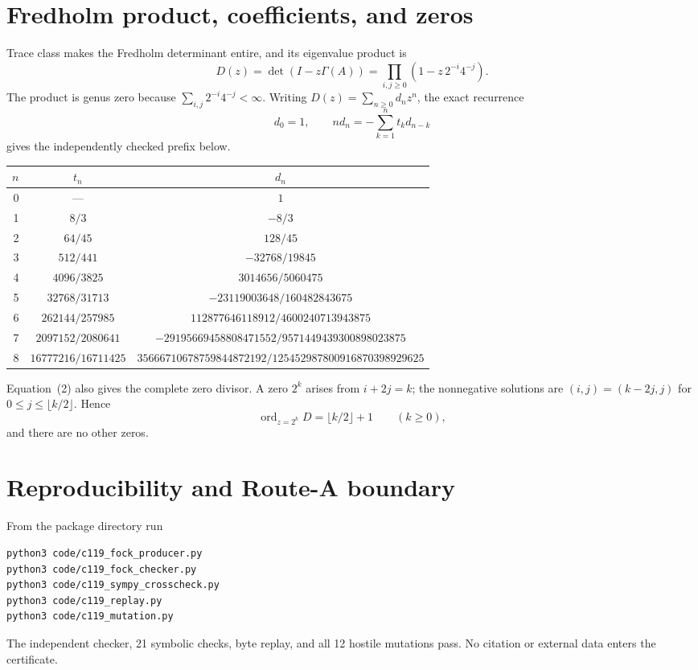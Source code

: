 \documentclass[10pt]{article}
\begin{document}
\section{Fredholm product, coefficients, and zeros}
Trace class makes the Fredholm determinant entire, and its eigenvalue product is
\begin{equation}
 D(z)=\det(I-z\Gamma(A))
 =\prod_{i,j\geq0}(1-z\,2^{-i}4^{-j}). \tag{2}
\end{equation}
The product is genus zero because $\sum_{i,j}2^{-i}4^{-j}<\infty$.
Writing $D(z)=\sum_{n\geq0}d_nz^n$, the exact recurrence
\[
 d_0=1,\qquad nd_n=-\sum_{k=1}^n t_kd_{n-k}
\]
gives the independently checked prefix below.
\begin{center}
\scriptsize
\begin{tabular}{@{}rcc@{}}
\toprule
$n$ & $t_n$ & $d_n$\\
\midrule
0 & --- & $1$\\
1 & $8/3$ & $-8/3$\\
2 & $64/45$ & $128/45$\\
3 & $512/441$ & $-32768/19845$\\
4 & $4096/3825$ & $3014656/5060475$\\
5 & $32768/31713$ & $-23119003648/160482843675$\\
6 & $262144/257985$ & $112877646118912/4600240713943875$\\
7 & $2097152/2080641$ & $-29195669458808471552/9571449439300898023875$\\
8 & $16777216/16711425$ & $35666710678759844872192/125452987800916870398929625$\\
\bottomrule
\end{tabular}
\end{center}
Equation~(2) also gives the complete zero divisor.  A zero $2^k$ arises from
$i+2j=k$; the nonnegative solutions are
$(i,j)=(k-2j,j)$ for $0\leq j\leq\lfloor k/2\rfloor$.  Hence
\[
 \operatorname{ord}_{z=2^k}D=\lfloor k/2\rfloor+1\qquad(k\geq0),
\]
and there are no other zeros.

\section{Reproducibility and Route-A boundary}
From the package directory run
\begin{verbatim}
python3 code/c119_fock_producer.py
python3 code/c119_fock_checker.py
python3 code/c119_sympy_crosscheck.py
python3 code/c119_replay.py
python3 code/c119_mutation.py
\end{verbatim}
The independent checker, 21 symbolic checks, byte replay, and all 12 hostile
mutations pass.  No citation or external data enters the certificate.
\end{document}
